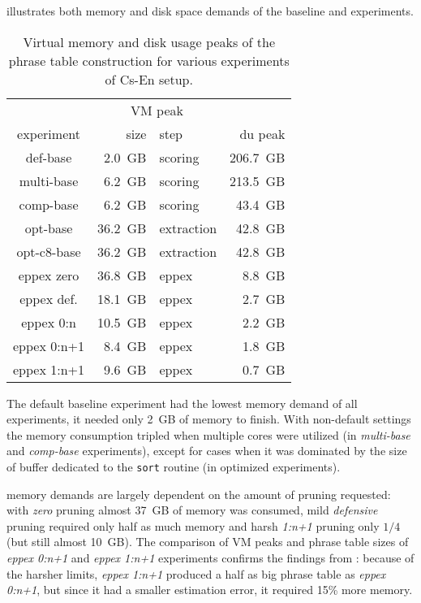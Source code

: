  illustrates both memory and disk space demands of the baseline
and \eppex{} experiments.

\begin{table}[ht]
\centering
\begin{tabular}{ | c | r l | r | }
\hline
 & \multicolumn{2}{|c|}{VM peak} & \\
experiment & size & step & du peak \\
\hline
\hline
def-base       &  2.0~GB &    scoring & 206.7~GB \\
multi-base     &  6.2~GB &    scoring & 213.5~GB \\
comp-base      &  6.2~GB &    scoring &  43.4~GB \\
opt-base       & 36.2~GB & extraction &  42.8~GB \\
opt-c8-base    & 36.2~GB & extraction &  42.8~GB \\
eppex zero     & 36.8~GB &      eppex &   8.8~GB \\
\hline
eppex def.     & 18.1~GB &      eppex &   2.7~GB \\
eppex 0:n      & 10.5~GB &      eppex &   2.2~GB \\
eppex 0:n+1    &  8.4~GB &      eppex &   1.8~GB \\
eppex 1:n+1    &  9.6~GB &      eppex &   0.7~GB \\
\hline
\end{tabular}
\caption{\label{cs-en-wmt13-vm-and-disk-usage-peaks}
Virtual memory and disk usage peaks of the phrase table construction for various experiments of Cs-En setup.}
\end{table}

The default baseline experiment had the lowest memory demand of all experiments, it needed only 2~GB
of memory to finish.
With non-default settings the memory consumption tripled when multiple cores were utilized (in \emph{multi-base}
and \emph{comp-base} experiments), except for cases when it was dominated by the size of buffer dedicated
to the \texttt{sort} routine (in optimized experiments).

\Eppex{} memory demands are largely dependent on the amount of pruning requested: with \emph{zero}
pruning almost 37~GB of memory was consumed, mild \emph{defensive} pruning required only half as much
memory and harsh \emph{1:n+1} pruning only $1/4$ (but still almost 10~GB).
The comparison of VM peaks and phrase table sizes of \emph{eppex 0:n+1} and \emph{eppex 1:n+1}
experiments confirms the findings from :
because of the harsher limits, \emph{eppex 1:n+1} produced a half as big phrase table as \emph{eppex 0:n+1},
but since it had a smaller estimation error, it required 15\% more memory.

